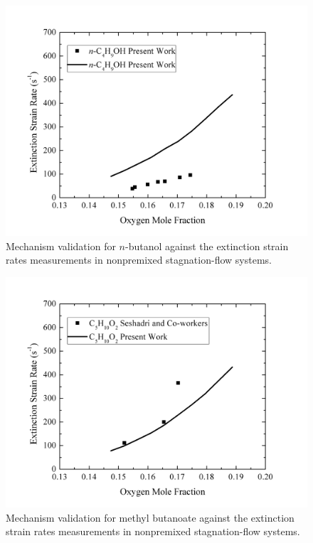 \begin{figure}[t]
  \centering
  \scriptsize
  \includegraphics[width=1.0\textwidth]{ch-biofuel/NB-ESR.png}
  \normalsize
  \caption{Mechanism validation for $n$-butanol against the extinction strain rates measurements in nonpremixed stagnation-flow systems.}
  \label{fig:validation-ESR_NB}
\end{figure}

\begin{figure}[t]
  \centering
  \scriptsize
  \includegraphics[width=1.0\textwidth]{ch-biofuel/MB-ESR.png}
  \normalsize
  \caption{Mechanism validation for methyl butanoate against the extinction strain rates measurements in nonpremixed stagnation-flow systems.}
  \label{fig:validation-ESR_MB}
\end{figure}

